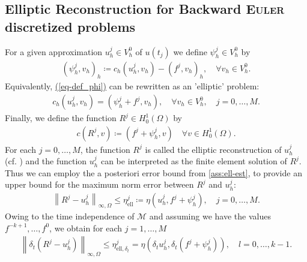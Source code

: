\documentclass[11pt, a4paper]{article}
\renewcommand{\eqref}[1]{\hyperref[#1]{(\ref{#1})}}  %
\newcommand{\scal}[2]{\left(#1,#2\right)}
\newcommand{\mM}{\mathcal{M}}
\newcommand{\norm}[1]{\left\|#1\right\|}
\begin{document}
	\subsection{Elliptic Reconstruction for Backward \textsc{Euler} discretized problems}
	For a given approximation \mbox{\(u^j_h \in V^0_h\)} of \(u(t_j)\) we define \mbox{$\psi^j_h \in V^0_h$} by
	\begin{gather}\label{eq-def_phi}
		\scal{\psi^j_h}{v_h}_h \coloneqq c_h\scal{u^j_h}{v_h} - \scal{f^j}{v_h}_h, \quad \forall v_h \in V^0_h.
	\end{gather}
	Equivalently, \eqref{eq-def_phi} can be rewritten as an 'elliptic' problem:
	\begin{gather*}
		c_h\scal{u^j_h}{v_h} = \scal{\psi^j_h + f^j}{v_h}, \quad \forall v_h \in V^0_h, \quad j=0,\dots,M.
	\end{gather*}
	Finally, we define the function \mbox{$R^j \in H^1_0(\Omega)$} by 
	\begin{gather}\label{eq-def_ell_rec}
		c\scal{R^j}{v} \coloneqq  \scal{f^j+\psi^j_h}{v} \quad \forall v\in H^1_0(\Omega). %
	\end{gather}
	For each \(j=0,\dots,M\), the function $R^j$ is called the elliptic reconstruction of $u^j_h$ (cf. \cite{nochetto2003reconstrution}) and the function $u^j_h$ can be interpreted as the finite element solution of $R^j$. Thus we can employ the a posteriori error bound from \autoref{ass:ell-est}, to provide an upper bound for the maximum norm error between $R^j$ and $u^j_h$:
	\begin{gather}\label{eq-ell-rec-max}
		\norm{R^j-u^j_h}_{\infty, \Omega} \leq \eta^j_\mathrm{ell} \coloneqq \eta\left(u^j_h, f^j+\psi^j_h\right), \quad j=0,\dots,M.
	\end{gather}
	Owing to the time independence of \(\mM\) and assuming we have the values \mbox{\(f^{-k+1},\dots,f^0\)}, we obtain for each \(j=1,\dots,M\) 
	\begin{gather}\label{eq:ell-rec-max-linear-comb}
		\norm{\delta_t\left(R^j-u^j_h\right)}_{\infty, \Omega} \leq \eta^j_{\mathrm{ell}, \delta_t} = \eta\left(\delta_t u^j_h, \delta_t\left(f^j+\psi^j_h\right)\right), \quad l=0,\dots,k-1.
	\end{gather}
	
\end{document}
